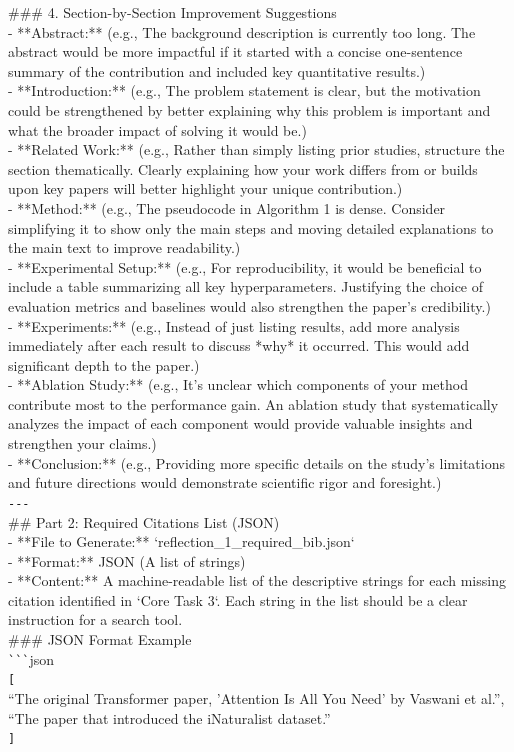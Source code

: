 \begin{tcolorbox}[colback=gray!10, colframe=gray!40!black, breakable=true, title=Prompt for Feedback Generation]
\#\#\# 4. Section-by-Section Improvement Suggestions\\
- **Abstract:** (e.g., The background description is currently too long. The abstract would be more impactful if it started with a concise one-sentence summary of the contribution and included key quantitative results.)\\
- **Introduction:** (e.g., The problem statement is clear, but the motivation could be strengthened by better explaining why this problem is important and what the broader impact of solving it would be.)\\
- **Related Work:** (e.g., Rather than simply listing prior studies, structure the section thematically. Clearly explaining how your work differs from or builds upon key papers will better highlight your unique contribution.)\\
- **Method:** (e.g., The pseudocode in Algorithm 1 is dense. Consider simplifying it to show only the main steps and moving detailed explanations to the main text to improve readability.)\\
- **Experimental Setup:** (e.g., For reproducibility, it would be beneficial to include a table summarizing all key hyperparameters. Justifying the choice of evaluation metrics and baselines would also strengthen the paper's credibility.)\\
- **Experiments:** (e.g., Instead of just listing results, add more analysis immediately after each result to discuss *why* it occurred. This would add significant depth to the paper.)\\
- **Ablation Study:** (e.g., It's unclear which components of your method contribute most to the performance gain. An ablation study that systematically analyzes the impact of each component would provide valuable insights and strengthen your claims.)\\
- **Conclusion:** (e.g., Providing more specific details on the study's limitations and future directions would demonstrate scientific rigor and foresight.)\\

\verb|---|\\
\#\# Part 2: Required Citations List (JSON)\\
- **File to Generate:** `reflection\_1\_required\_bib.json`\\
- **Format:** JSON (A list of strings)\\
- **Content:** A machine-readable list of the descriptive strings for each missing citation identified in `Core Task 3`. Each string in the list should be a clear instruction for a search tool.\\

\#\#\# JSON Format Example\\
\verb|```|json\\
\verb|[|\\
  ``The original Transformer paper, 'Attention Is All You Need' by Vaswani et al.'',\\
  ``The paper that introduced the iNaturalist dataset.''\\
\verb|]|
\end{tcolorbox}

